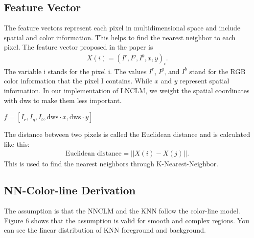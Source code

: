 \subsection{Feature Vector}
\label{subsec:feat}
The feature vectors represent each pixel in multidimensional space and include spatial and color information. This helps to find the nearest neighbor to each pixel. The feature vector proposed in the paper \cite{lnclm} is
\begin{align}
	X(i) = (I^r,I^g,I^b,x,y)_i .
\end{align} 
The variable i stands for the pixel i. The values \(I^r\), \(I^g\), and \(I^b\) stand for the RGB color information that the pixel I contains. While \(x\) and \(y\) represent spatial information. In our implementation of LNCLM, we weight the spatial coordinates with dws to make them less important. 


\begin{algorithm}
	\begin{algorithmic}[1]
		
		\State $ f = [I_r, I_g, I_b, \text{dws} \cdot x,   \text{dws} \cdot y ]$
		
	\end{algorithmic}
\end{algorithm}

The distance between two pixels is called the Euclidean distance and is calculated like this: 
\begin{align}
	\text{Euclidean distance} = ||X(i) - X(j)|| . 
\end{align} 
This is used to find the nearest neighbors through K-Nearest-Neighbor.



\subsection{NN-Color-line Derivation}
\label{nncolor}
The assumption is that the NNCLM and the KNN follow the color-line model. Figure 6 shows that the assumption is valid for smooth and complex regions. You can see the linear distribution of KNN foreground and background. 

